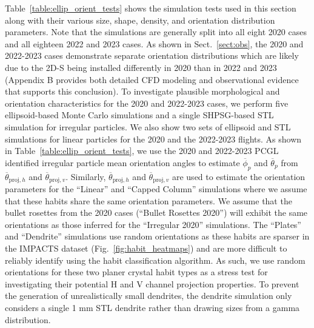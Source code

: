 \documentclass[amt, manuscript]{copernicus}
\begin{document}
Table~\ref{table:ellip_orient_tests} shows the simulation tests used in this section along with their various size, shape, density, and orientation distribution parameters. Note that the simulations are generally split into all eight 2020 cases and all eighteen 2022 and 2023 cases. As shown in Sect.~\ref{sect:obs}, the 2020 and 2022-2023 cases demonstrate separate orientation distributions which are likely due to the 2D-S being installed differently in 2020 than in 2022 and 2023  (Appendix B provides both detailed CFD modeling and observational evidence that supports this conclusion). To investigate plausible morphological and orientation characteristics for the 2020 and 2022-2023 cases, we perform five ellipsoid-based Monte Carlo simulations and a single SHPSG-based STL simulation for irregular particles. We also show two sets of ellipsoid and STL simulations for linear particles for the 2020 and the 2022-2023 flights. As shown in Table~\ref{table:ellip_orient_tests}, we use the 2020 and 2022-2023 PCGL \citet{Schima2024} identified irregular particle mean orientation angles to estimate $\overline{\phi}_{p}$ and $\overline{\theta}_{p}$ from $\overline{\theta}_{\mathrm{proj},h}$ and $\overline{\theta}_{\mathrm{proj},v}$. Similarly, $\overline{\theta}_{\mathrm{proj},h}$ and $\overline{\theta}_{\mathrm{proj},v}$ are used to estimate the orientation parameters for the ``Linear'' and ``Capped Column'' simulations where we assume that these habits share the same orientation parameters. We assume that the bullet rosettes from the 2020 cases (``Bullet Rosettes 2020'') will exhibit the same orientations as those inferred for the ``Irregular 2020'' simulations. The ``Plates'' and ``Dendrite'' simulations use random orientations as these habits are sparser in the IMPACTS dataset (Fig.~\ref{fig:habit_heatmaps}) and are more difficult to reliably identify using the \citet{Schima2024} habit classification algorithm. As such, we use random orientations for these two planer crystal habit types as a stress test for investigating their potential H and V channel projection properties. To prevent the generation of unrealistically small dendrites, the dendrite simulation only considers a single 1 mm STL dendrite rather than drawing sizes from a gamma distribution.

\end{document}
